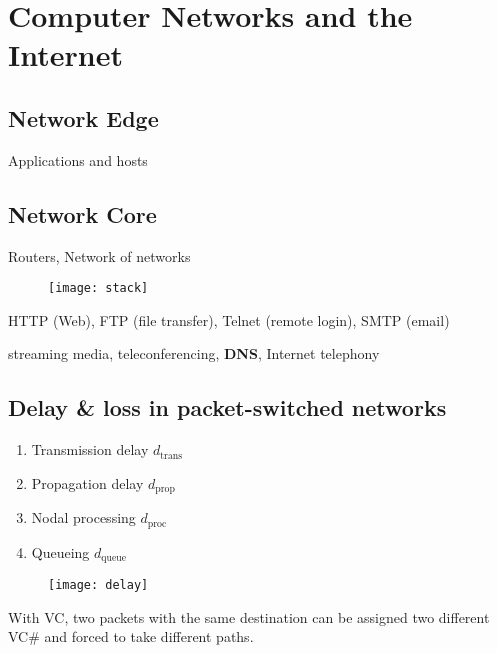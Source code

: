 \section{Computer Networks and the Internet}

\subsection{Network Edge}
 Applications and hosts

\subsection{Network Core}
 Routers, Network of networks

\begin{figure}[H]
  \centering
  \texttt{[image: stack]}
\end{figure}

 HTTP (Web), FTP (file transfer), Telnet (remote login), SMTP (email)

 streaming media, teleconferencing, \textbf{DNS}, Internet telephony

\subsection{Delay \& loss in packet-switched networks}

\begin{enumerate}
  \item Transmission delay $d_{\text{trans}}$
  \item Propagation delay $d_{\text{prop}}$
  \item Nodal processing $d_{\text{proc}}$
  \item Queueing $d_{\text{queue}}$
\end{enumerate}
\begin{figure}[H]
  \centering
  \texttt{[image: delay]}
\end{figure}

 With VC, two packets with the same destination can be assigned two different
VC\# and forced to take different paths.
